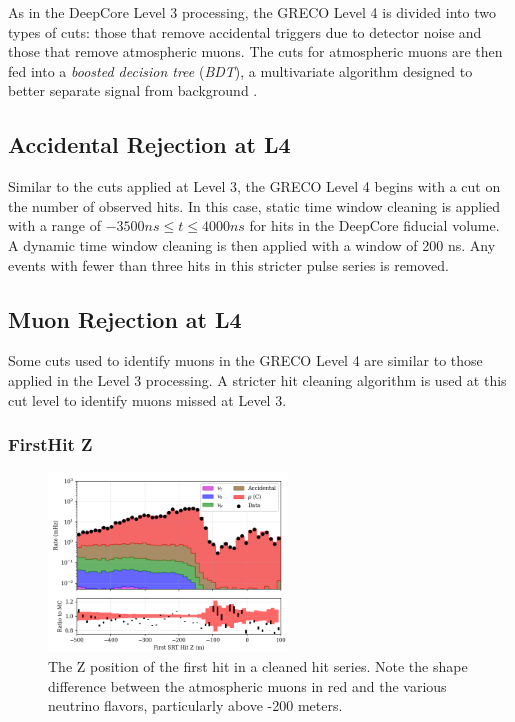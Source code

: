 As in the DeepCore Level 3 processing, the GRECO Level 4 is divided into two types of cuts: those that remove accidental triggers due to detector noise and those that remove atmospheric muons. 
The cuts for atmospheric muons are then fed into a \emph{boosted decision tree} (\emph{BDT}), a multivariate algorithm designed to better separate signal from background \cite{TMVA}.
 
\subsection{Accidental Rejection at L4}
Similar to the cuts applied at Level 3, the GRECO Level 4 begins with a cut on the number of observed hits. 
In this case, static time window cleaning is applied with a range of $-3500 ns \leq t \leq 4000 ns$ for hits in the DeepCore fiducial volume.
A dynamic time window cleaning is then applied with a window of 200 ns.
Any events with fewer than three hits in this stricter pulse series is removed.

\subsection{Muon Rejection at L4}
Some cuts used to identify muons in the GRECO Level 4 are similar to those applied in the Level 3 processing. 
A stricter hit cleaning algorithm is used at this cut level to identify muons missed at Level 3.

\subsubsection{FirstHit Z}
\begin{figure}[h]
	\centering
		\includegraphics[width=2.5in]{FirstHitZ_log.png}
		\caption[The FirstHit Z position]{The Z position of the first hit in a cleaned hit series. Note the shape difference between the atmospheric muons in red and the various neutrino flavors, particularly above -200 meters.}
	\label{fig:firsthitz_log}
\end{figure}

